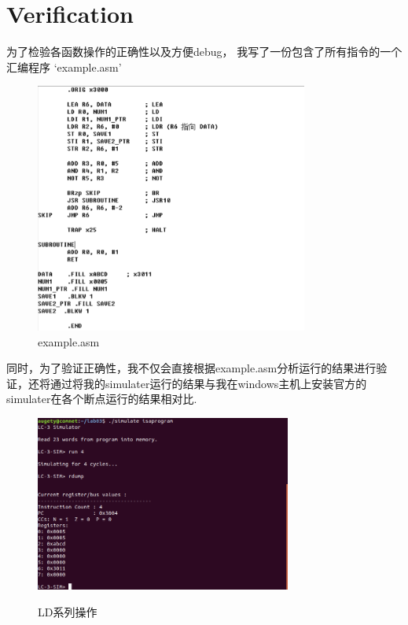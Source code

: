 \documentclass[runningheads]{llncs}
\begin{document}
\section{Verification}
为了检验各函数操作的正确性以及方便debug， 我写了一份包含了所有指令的一个汇编程序 `example.asm'
\begin{figure}[H]
    \centering
    \includegraphics[width=0.8\textwidth]{1.png}
    \caption{example.asm}
    \label{fig:3-1}
\end{figure}
同时，为了验证正确性，我不仅会直接根据example.asm分析运行的结果进行验证，还将通过将我的simulater运行的结果与我在windows主机上安装官方的simulater在各个断点运行的结果相对比.
\begin{figure}[H]
    \centering
    \includegraphics[width=0.75\textwidth]{2.png}
    \label{fig:3-2}
    \caption{LD系列操作}
\end{figure}
\vspace{-1.5cm}
\end{document}
